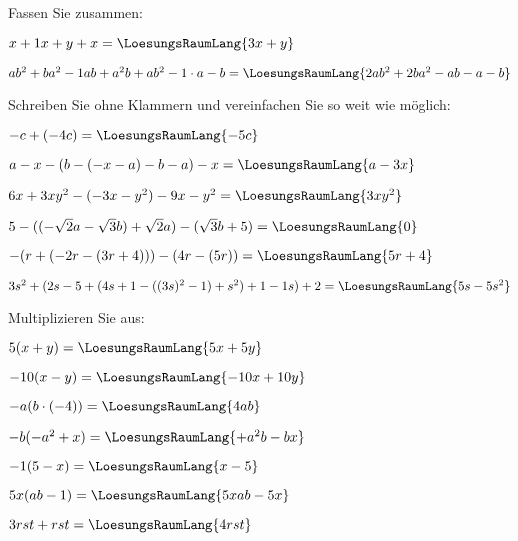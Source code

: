 
\renewcommand{\bbwAufgabenBlockID}{A1G}

\renewcommand{\metaHeaderLine}{Aufgabenblatt}
\renewcommand{\arbeitsblattTitel}{Grundoperationen}



\arbeitsblattHeader{}
Fassen Sie zusammen:
\begin{bbwAufgabenBlock}
\item $x+1x+y+x = \LoesungsRaumLang{3x+y}$
\item $ab^2+ba^2 - 1ab + a^2b + ab^2 - 1\cdot{}a -b  = \LoesungsRaumLang{2ab^2 + 2ba^2 - ab - a - b}$
\end{bbwAufgabenBlock}

Schreiben Sie ohne Klammern und vereinfachen Sie so weit wie möglich:
\begin{bbwAufgabenBlock}
\item $-c+(-4c) = \LoesungsRaumLang{-5c}$
\item $a-x-(b-(-x-a)-b-a)-x = \LoesungsRaumLang{a-3x}$
\item $6x+3xy^2 -(-3x-y^2)-9x-y^2 = \LoesungsRaumLang{3xy^2}$
\item $5-((-\sqrt{2}a - \sqrt{3}b)+\sqrt{2}a)-(\sqrt{3}b+5)= \LoesungsRaumLang{0}$
\item $-(r+(-2r-(3r+4)))-(4r-(5r))=\LoesungsRaumLang{5r+4}$
\item $3s^2+(2s-5+(4s+1-((3s)^2-1)+s^2)+1-1s)+2 = \LoesungsRaumLang{5s-5s^2}$
\end{bbwAufgabenBlock}
\platzFuerBerechnungenBisEndeSeite{}



Multiplizieren Sie aus:

\begin{bbwAufgabenBlock}
\item $5(x+y)=\LoesungsRaumLang{5x+5y}$
\item $-10(x-y)=\LoesungsRaumLang{-10x+10y}$
\item $-a(b\cdot{}(-4)) = \LoesungsRaumLang{4ab}$
\item $-b(-a^2+x) = \LoesungsRaumLang{+a^2b - bx}$
\item $-1(5-x)=\LoesungsRaumLang{x-5}$
\item $5x(ab-1)=\LoesungsRaumLang{5xab - 5x}$
\item $3rst + rst=\LoesungsRaumLang{4rst}$
\end{bbwAufgabenBlock}


